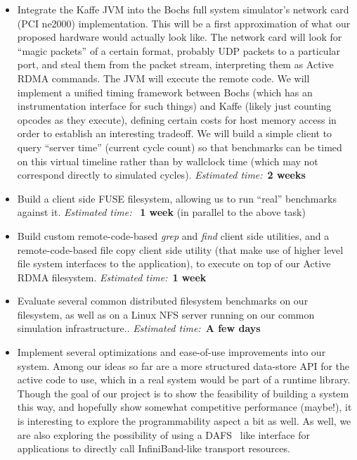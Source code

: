 \documentclass[10pt]{article}
\begin{document}
\begin{itemize}
\item Integrate the Kaffe JVM into the Bochs full system simulator's
  network card (PCI ne2000) implementation. This will be a first
  approximation of what our proposed hardware would actually look
  like. The network card will look for ``magic packets'' of a certain
  format, probably UDP packets to a particular port, and steal them
  from the packet stream, interpreting them as Active RDMA
  commands. The JVM will execute the remote code. We will implement a
  unified timing framework between Bochs (which has an instrumentation
  interface for such things) and Kaffe (likely just counting opcodes
  as they execute), defining certain costs for host memory access in
  order to establish an interesting tradeoff. We will build a simple
  client to query ``server time'' (current cycle count) so that
  benchmarks can be timed on this virtual timeline rather than by
  wallclock time (which may not correspond directly to simulated
  cycles). \emph{Estimated time:}~\textbf{2 weeks}

\item Build a client side FUSE filesystem, allowing us to run
  ``real'' benchmarks against it. \emph{Estimated time:
  }~\textbf{1 week} (in parallel to the above task)

\item Build custom remote-code-based \emph{grep} and \emph{find}
  client side utilities, and a remote-code-based file copy client side
  utility (that make use of higher level file system interfaces to the
  application), to execute on top of our Active RDMA filesystem.
  \emph{Estimated time:}~\textbf{1 week}

\item Evaluate several common distributed filesystem benchmarks on our
  filesystem, as well as on a Linux NFS server running on our common
  simulation infrastructure.. \emph{Estimated time:}~\textbf{A few
    days}

\item Implement several optimizations and ease-of-use improvements
  into our system. Among our ideas so far are a more structured
  data-store API for the active code to use, which in a real system
  would be part of a runtime library. Though the goal of our project
  is to show the feasibility of building a system this way, and
  hopefully show somewhat competitive performance (maybe!), it is
  interesting to explore the programmability aspect a bit as well. As
  well, we are also exploring the possibility of using a
  DAFS~\cite{DAFS} like interface for applications to directly call
  InfiniBand-like transport resources.

\end{itemize}
\end{document}
